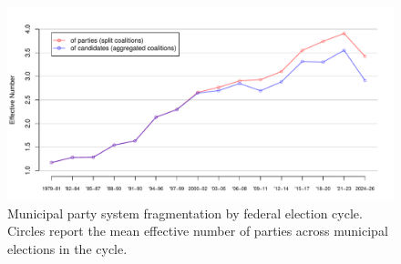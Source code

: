 \documentclass[letter,12pt]{article}
\newcommand{\mc}{\multicolumn}
\begin{document}
\begin{figure}
  \includegraphics[width=\columnwidth]{../../plots/enp1979-2025.pdf}
  \caption{Municipal party system fragmentation by federal election cycle. Circles report the mean effective number of parties across municipal elections in the cycle.}\label{F:enp}
\end{figure}

\end{document}
